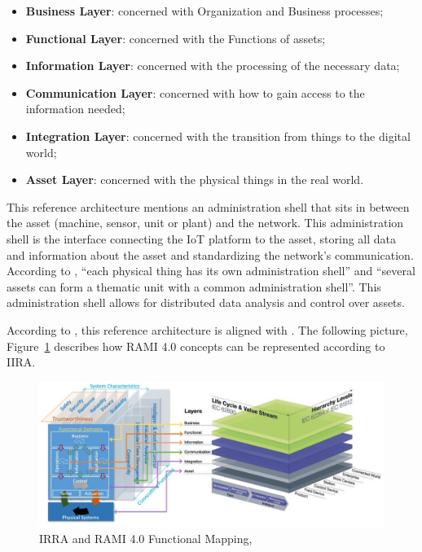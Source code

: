\begin{itemize}
    \item \textbf{Business Layer}: concerned with Organization and Business processes;
    \item \textbf{Functional Layer}: concerned with the Functions of assets;
    \item \textbf{Information Layer}: concerned with the processing of the necessary data; 
    \item \textbf{Communication Layer}: concerned with how to gain access to the information needed;
    \item \textbf{Integration Layer}: concerned with the transition from things to the digital world;
    \item \textbf{Asset Layer}: concerned with the physical things in the real world.
\end{itemize}

This reference architecture mentions an administration shell that sits in between the asset (machine, sensor, unit or plant) and the network. This administration shell is the interface connecting the \gls{IoT} platform to the asset, storing all data and information about the asset and standardizing the network's communication. According to \cite{rami2}, ``each physical thing has its own administration shell'' and ``several assets can form a thematic unit with a common administration shell''. This administration shell allows for distributed data analysis and control over assets. 

According to \cite{iira-inter-rami}, this reference architecture is aligned with . The following picture, Figure~\ref{fig:stateofart:arch:rami:mapping} describes how RAMI 4.0 concepts can be represented according to IIRA.

\begin{figure}[H]
    \centering
    \includegraphics[scale=0.35]{
        assets/figures/iira-rami-mapping.png
    }
    \caption[IIRA and RAMI 4.0 Functional Mapping]{IRRA and RAMI 4.0 Functional Mapping, \cite{iira-inter-rami}}
    \label{fig:stateofart:arch:rami:mapping}
\end{figure}

